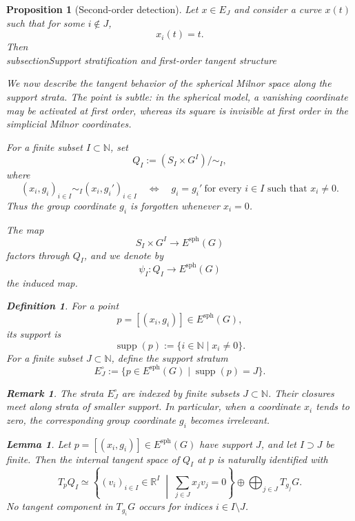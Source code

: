 \documentclass[11pt]{amsart}
\newtheorem{lemma}[theorem]{Lemma}
\newtheorem{proposition}[theorem]{Proposition}
\newtheorem{definition}[theorem]{Definition}
\newtheorem{remark}[theorem]{Remark}
\begin{document}
\begin{proposition}[Second-order detection]
Let $x \in E_J$ and consider a curve $x(t)$ such that for some $i \notin J$,
\[
x_i(t) = t.
\]
Then
\\subsection{Support stratification and first-order tangent structure}

We now describe the tangent behavior of the spherical Milnor space along the support strata. The point is subtle: in the spherical model, a vanishing coordinate may be activated at first order, whereas its square is invisible at first order in the simplicial Milnor coordinates.

For a finite subset \(I\subset \mathbb N\), set
\[
Q_I
:=
(S_I\times G^I)/\!\sim_I,
\]
where
\[
(x_i,g_i)_{i\in I}\sim_I (x_i,g_i')_{i\in I}
\quad\Longleftrightarrow\quad
g_i=g_i' \ \text{for every } i\in I \text{ such that } x_i\neq 0.
\]
Thus the group coordinate \(g_i\) is forgotten whenever \(x_i=0\).

The map
\[
S_I\times G^I\longrightarrow E^{\mathrm{sph}}(G)
\]
factors through \(Q_I\), and we denote by
\[
\psi_I:Q_I\longrightarrow E^{\mathrm{sph}}(G)
\]
the induced map.

\begin{definition}
For a point
\[
p=[(x_i,g_i)]\in E^{\mathrm{sph}}(G),
\]
its \emph{support} is
\[
\operatorname{supp}(p):=\{i\in\mathbb N\mid x_i\neq 0\}.
\]
For a finite subset \(J\subset \mathbb N\), define the support stratum
\[
E_J^\circ
:=
\{p\in E^{\mathrm{sph}}(G)\mid \operatorname{supp}(p)=J\}.
\]
\end{definition}

\begin{remark}
The strata \(E_J^\circ\) are indexed by finite subsets \(J\subset\mathbb N\). Their closures meet along strata of smaller support. In particular, when a coordinate \(x_i\) tends to zero, the corresponding group coordinate \(g_i\) becomes irrelevant.
\end{remark}

\begin{lemma}
Let \(p=[(x_i,g_i)]\in E^{\mathrm{sph}}(G)\) have support \(J\), and let \(I\supset J\) be finite. Then the internal tangent space of \(Q_I\) at \(p\) is naturally identified with
\[
T_p Q_I
\simeq
\left\{
(v_i)_{i\in I}\in \mathbb R^I
\;\middle|\;
\sum_{j\in J} x_j v_j=0
\right\}
\oplus
\bigoplus_{j\in J} T_{g_j}G.
\]
No tangent component in \(T_{g_i}G\) occurs for indices \(i\in I\setminus J\).
\end{lemma}


\end{proposition}
\end{document}
